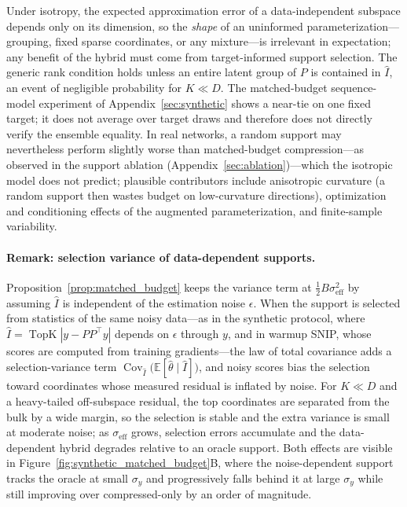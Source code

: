 Under isotropy, the expected approximation error of a data-independent subspace depends only on its dimension, so the \emph{shape} of an uninformed parameterization---grouping, fixed sparse coordinates, or any mixture---is irrelevant in expectation; any benefit of the hybrid must come from target-informed support selection.
The generic rank condition holds unless an entire latent group of $P$ is contained in $\hat{I}$, an event of negligible probability for $K\ll D$.
The matched-budget sequence-model experiment of Appendix~\ref{sec:synthetic} shows a near-tie on one fixed target; it does not average over target draws and therefore does not directly verify the ensemble equality.
In real networks, a random support may nevertheless perform slightly worse than matched-budget compression---as observed in the support ablation (Appendix~\ref{sec:ablation})---which the isotropic model does not predict; plausible contributors include anisotropic curvature (a random support then wastes budget on low-curvature directions), optimization and conditioning effects of the augmented parameterization, and finite-sample variability.

\paragraph{Remark: selection variance of data-dependent supports.}
Proposition~\ref{prop:matched_budget} keeps the variance term at $\frac{1}{2}B\sigma_{\mathrm{eff}}^2$ by assuming $\hat{I}$ is independent of the estimation noise $\epsilon$.
When the support is selected from statistics of the same noisy data---as in the synthetic protocol, where $\hat I=\operatorname{TopK}|y-PP^\top y|$ depends on $\epsilon$ through $y$, and in warmup SNIP, whose scores are computed from training gradients---the law of total covariance adds a selection-variance term $\operatorname{Cov}_{\hat I}\big(\mathbb{E}[\hat\theta\mid\hat I]\big)$, and noisy scores bias the selection toward coordinates whose measured residual is inflated by noise.
For $K\ll D$ and a heavy-tailed off-subspace residual, the top coordinates are separated from the bulk by a wide margin, so the selection is stable and the extra variance is small at moderate noise; as $\sigma_{\mathrm{eff}}$ grows, selection errors accumulate and the data-dependent hybrid degrades relative to an oracle support.
Both effects are visible in Figure~\ref{fig:synthetic_matched_budget}B, where the noise-dependent support tracks the oracle at small $\sigma_y$ and progressively falls behind it at large $\sigma_y$ while still improving over compressed-only by an order of magnitude.

